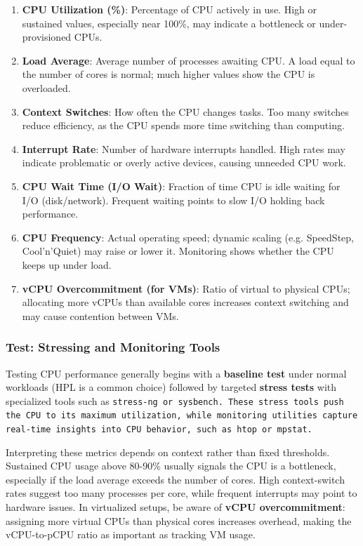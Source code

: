 \begin{enumerate}[leftmargin=1.4em]
    \item \textbf{CPU Utilization (\%)}: Percentage of CPU actively in use. High or sustained values, especially near 100\%, may indicate a bottleneck or under-provisioned CPUs.
    \item \textbf{Load Average}: Average number of processes awaiting CPU. A load equal to the number of cores is normal; much higher values show the CPU is overloaded.
    \item \textbf{Context Switches}: How often the CPU changes tasks. Too many switches reduce efficiency, as the CPU spends more time switching than computing.
    \item \textbf{Interrupt Rate}: Number of hardware interrupts handled. High rates may indicate problematic or overly active devices, causing unneeded CPU work.
    \item \textbf{CPU Wait Time (I/O Wait)}: Fraction of time CPU is idle waiting for I/O (disk/network). Frequent waiting points to slow I/O holding back performance.
    \item \textbf{CPU Frequency}: Actual operating speed; dynamic scaling (e.g. SpeedStep, Cool'n'Quiet) may raise or lower it. Monitoring shows whether the CPU keeps up under load.
    \item \textbf{vCPU Overcommitment (for VMs)}: Ratio of virtual to physical CPUs; allocating more vCPUs than available cores increases context switching and may cause contention between VMs.
\end{enumerate}

\subsubsection{Test: Stressing and Monitoring Tools}

Testing CPU performance generally begins with a \textbf{baseline test} under normal workloads (HPL is a common choice) followed by targeted \textbf{stress tests} with specialized tools such as \tt{stress-ng} or \tt{sysbench}. These stress tools push the CPU to its maximum utilization, while monitoring utilities capture real-time insights into CPU behavior, such as \tt{htop} or \tt{mpstat}.

Interpreting these metrics depends on context rather than fixed thresholds. Sustained CPU usage above 80-90\% usually signals the CPU is a bottleneck, especially if the load average exceeds the number of cores. High context-switch rates suggest too many processes per core, while frequent interrupts may point to hardware issues. In virtualized setups, be aware of \textbf{vCPU overcommitment}: assigning more virtual CPUs than physical cores increases overhead, making the vCPU-to-pCPU ratio as important as tracking VM usage.

